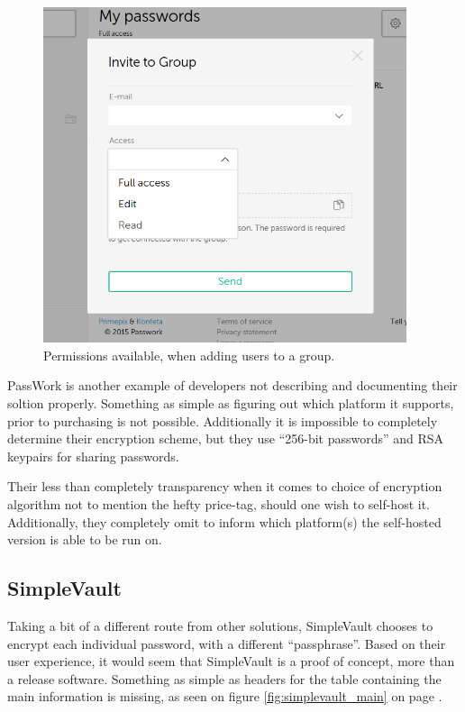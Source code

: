 			\begin{figure}[htbp]
				\centering
				\includegraphics[width=0.95\textwidth]{figures/analysis/passwork_adduser_cropped.png}
				\caption{Permissions available, when adding users to a group.}
				\label{fig:passwork_adduser}
			\end{figure}

			PassWork is another example of developers not describing and documenting their soltion properly. Something as simple as figuring out which platform it supports, prior to purchasing is not possible. Additionally it is impossible to completely determine their encryption scheme, but they use ``256-bit passwords'' and RSA keypairs for sharing passwords. 

			Their less than completely transparency when it comes to choice of encryption algorithm not to mention the hefty price-tag, should one wish to self-host it. Additionally, they completely omit to inform which platform(s) the self-hosted version is able to be run on.

		\subsection*{SimpleVault}
			Taking a bit of a different route from other solutions, SimpleVault\cite{simplevault} chooses to encrypt each individual password, with a different ``passphrase''. Based on their user experience, it would seem that SimpleVault is a proof of concept, more than a release software. Something as simple as headers for the table containing the main information is missing, as seen on figure \ref{fig:simplevault_main} on page \pageref{fig:simplevault_main}.

